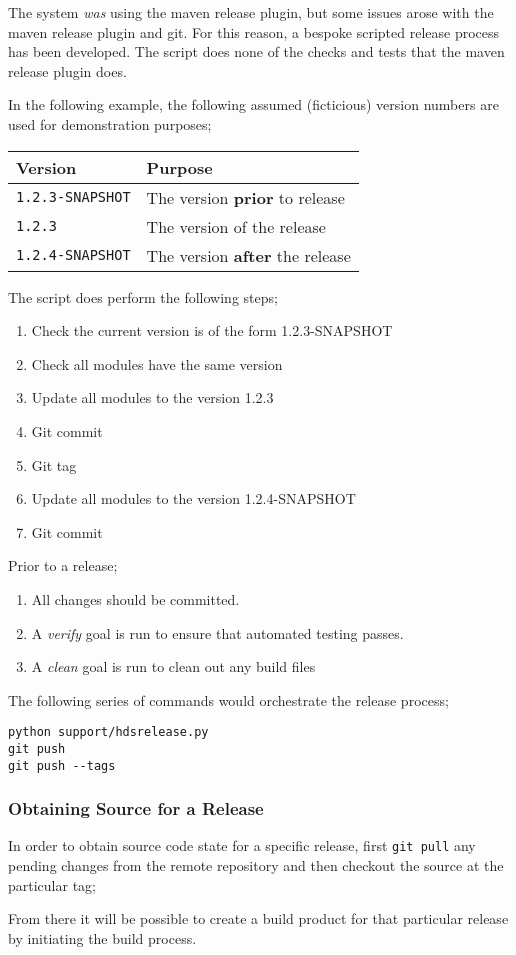 The system {\it was} using the maven release plugin, but some issues arose with the maven release plugin and git.  For this reason, a bespoke scripted release process has been developed.  The script does none of the checks and tests that the maven release plugin does.

In the following example, the following assumed (ficticious) version numbers are used for demonstration purposes;

\begin{tabular}{ | l | l | }
\hline
Version & Purpose \\
\hline
{\tt 1.2.3-SNAPSHOT} & The version {\bf prior} to release \\
{\tt 1.2.3} & The version of the release  \\
{\tt 1.2.4-SNAPSHOT} & The version {\bf after} the release \\
\hline
\end{tabular}

The script does perform the following steps;

\begin{enumerate}
\item Check the current version is of the form 1.2.3-SNAPSHOT
\item Check all modules have the same version
\item Update all modules to the version 1.2.3
\item Git commit
\item Git tag
\item Update all modules to the version 1.2.4-SNAPSHOT
\item Git commit
\end{enumerate}

Prior to a release;

\begin{enumerate}
\item All changes should be committed.
\item A {\it verify} goal is run to ensure that automated testing passes.
\item A {\it clean} goal is run to clean out any build files
\end{enumerate}

The following series of commands would orchestrate the release process;

\begin{verbatim}
python support/hdsrelease.py
git push
git push --tags
\end{verbatim}

\subsubsection{Obtaining Source for a Release}

In order to obtain source code state for a specific release, first {\tt git pull} any pending changes from the remote repository and then checkout the source at the particular tag;


From there it will be possible to create a build product for that particular release by initiating the build process.
